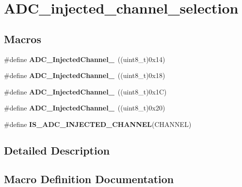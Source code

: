\hypertarget{group___a_d_c__injected__channel__selection}{}\section{A\+D\+C\+\_\+injected\+\_\+channel\+\_\+selection}
\label{group___a_d_c__injected__channel__selection}
\subsection*{Macros}
\begin{DoxyCompactItemize}
\item 
\#define {\bfseries A\+D\+C\+\_\+\+Injected\+Channel\+\_}~((uint8\+\_\+t)0x14)\hypertarget{group___a_d_c__injected__channel__selection_ga8792d4ae0fa82dd317252c72815684ba}{}\label{group___a_d_c__injected__channel__selection_ga8792d4ae0fa82dd317252c72815684ba}

\item 
\#define {\bfseries A\+D\+C\+\_\+\+Injected\+Channel\+\_}~((uint8\+\_\+t)0x18)\hypertarget{group___a_d_c__injected__channel__selection_ga2e322fccc7de16a0e79be573f5b1211c}{}\label{group___a_d_c__injected__channel__selection_ga2e322fccc7de16a0e79be573f5b1211c}

\item 
\#define {\bfseries A\+D\+C\+\_\+\+Injected\+Channel\+\_}~((uint8\+\_\+t)0x1\+C)\hypertarget{group___a_d_c__injected__channel__selection_ga6bf03d805645b942bdcc53504e772cf1}{}\label{group___a_d_c__injected__channel__selection_ga6bf03d805645b942bdcc53504e772cf1}

\item 
\#define {\bfseries A\+D\+C\+\_\+\+Injected\+Channel\+\_}~((uint8\+\_\+t)0x20)\hypertarget{group___a_d_c__injected__channel__selection_ga31d18bbcfa7b685e90c3a1313d9c6406}{}\label{group___a_d_c__injected__channel__selection_ga31d18bbcfa7b685e90c3a1313d9c6406}

\item 
\#define {\bfseries I\+S\+\_\+\+A\+D\+C\+\_\+\+I\+N\+J\+E\+C\+T\+E\+D\+\_\+\+C\+H\+A\+N\+N\+EL}(C\+H\+A\+N\+N\+EL)
\end{DoxyCompactItemize}


\subsection{Detailed Description}


\subsection{Macro Definition Documentation}
